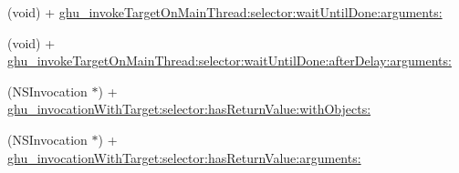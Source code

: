 \begin{DoxyCompactItemize}
\item 
(void) + \hyperlink{interface_n_s_invocation_07_g_h_utils___g_h_u_n_i_t_08_a261cd5aa6061478716fba4f79cb4f69b}{ghu\-\_\-invoke\-Target\-On\-Main\-Thread\-:selector\-:wait\-Until\-Done\-:arguments\-:}
\item 
(void) + \hyperlink{interface_n_s_invocation_07_g_h_utils___g_h_u_n_i_t_08_a0b891f27c084f6677907e0f907caf5f9}{ghu\-\_\-invoke\-Target\-On\-Main\-Thread\-:selector\-:wait\-Until\-Done\-:after\-Delay\-:arguments\-:}
\item 
(\-N\-S\-Invocation $\ast$) + \hyperlink{interface_n_s_invocation_07_g_h_utils___g_h_u_n_i_t_08_a31d3598ec7e21face3cb783c2c60b42c}{ghu\-\_\-invocation\-With\-Target\-:selector\-:has\-Return\-Value\-:with\-Objects\-:}
\item 
(\-N\-S\-Invocation $\ast$) + \hyperlink{interface_n_s_invocation_07_g_h_utils___g_h_u_n_i_t_08_a64dcd5d1f117118b02213db0846092d9}{ghu\-\_\-invocation\-With\-Target\-:selector\-:has\-Return\-Value\-:arguments\-:}
\end{DoxyCompactItemize}


